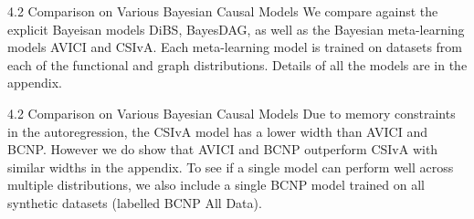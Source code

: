\documentclass[aspectratio=169,10pt]{beamer}
\begin{document}
\begin{frame}{4.2 Comparison on Various Bayesian Causal Models}
\small
We compare against the explicit Bayeisan models DiBS, BayesDAG, as well as the Bayesian meta-learning models AVICI and CSIvA. Each meta-learning model is trained on datasets from each of the functional and graph distributions. Details of all the models are in the appendix.
\end{frame}

\begin{frame}{4.2 Comparison on Various Bayesian Causal Models}
\small
Due to memory constraints in the autoregression, the CSIvA model has a lower width than AVICI and BCNP. However we do show that AVICI and BCNP outperform CSIvA with similar widths in the appendix. To see if a single model can perform well across multiple distributions, we also include a single BCNP model trained on all synthetic datasets (labelled BCNP All Data).
\end{frame}
\end{document}
